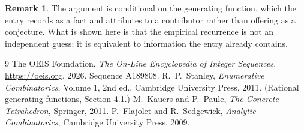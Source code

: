 \documentclass[11pt,a4paper]{article}
\theoremstyle{plain}
\theoremstyle{definition}
\newtheorem{remark}[theorem]{Remark}
\begin{document}
\begin{remark}
The argument is conditional on the generating function, which the entry records as a fact and
attributes to a contributor rather than offering as a conjecture. What is shown here is that
the empirical recurrence is not an independent guess: it is equivalent to information the
entry already contains.
\end{remark}

\begin{thebibliography}{9}
 The OEIS Foundation, \emph{The On-Line Encyclopedia of Integer
Sequences}, \url{https://oeis.org}, 2026. Sequence A189808.
 R.~P.~Stanley, \emph{Enumerative Combinatorics}, Volume 1, 2nd ed.,
Cambridge University Press, 2011. (Rational generating functions, Section 4.1.)
 M.~Kauers and P.~Paule, \emph{The Concrete Tetrahedron}, Springer, 2011.
 P.~Flajolet and R.~Sedgewick, \emph{Analytic Combinatorics}, Cambridge
University Press, 2009.
\end{thebibliography}
\end{document}
